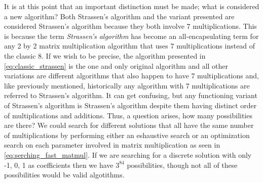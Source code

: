     It is at this point that an important distinction must be made; what is
    considered a new algorithm? Both Strassen's algorithm and the variant presented
    are considered Strassen's algorithm because they both involve 7 multiplications.
    This is because the term \textit{Strassen's algorithm} has become an
    all-encapsulating term for any 2 by 2 matrix multiplication algorithm that uses
    7 multiplications instead of the classic 8. If we wish to be precise, the
    algorithm presented in \ref{eq:classic_strassen} is the one and only original
    algorithm and all other variations are different algorithms that also happen to
    have 7 multiplications and, like previously mentioned, historically any
    algorithm with 7 multiplications are referred to Strassen's algorithm. It can
    get confusing, but any functioning variant of Strassen's algorithm is Strassen's
    algorithm despite them having distinct order of multiplications and additions.
    Thus, a question arises, how many possibilities are there? We could search for
    different solutions that all have the same number of multiplications by
    performing either an eshaustive search or an optimization search on each
    parameter involved in matrix multiplication as seen in
    \ref{eq:serching_fast_matmul}. If we are searching for a discrete solution with
    only -1, 0, 1 as coefficients then we have $3^84$ possibilities, though not all
    of these possibilities would be valid algotithms.


